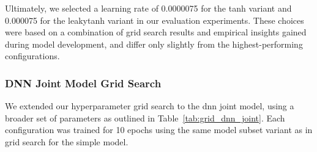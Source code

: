 Ultimately, we selected a learning rate of 0.0000075 for the tanh variant and 0.000075 for the leakytanh variant in our evaluation experiments. These choices were based on a combination of grid search results and empirical insights gained during model development, and differ only slightly from the highest-performing configurations.

\subsubsection{DNN Joint Model Grid Search}
\label{subsubsec:dnn_joint_grid_search}
We extended our hyperparameter grid search to the dnn joint model, using a broader set of parameters as outlined in Table~\ref{tab:grid_dnn_joint}. Each configuration was trained for 10 epochs using the same model subset variant as in grid search for the simple model.

